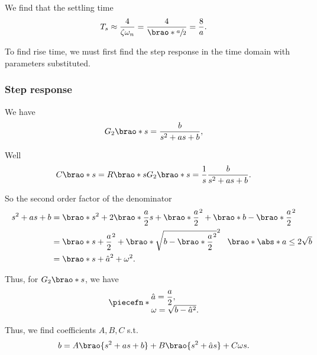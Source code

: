 \documentclass[12pt]{article}
\DeclarePairedDelimiter\brao()%
\DeclarePairedDelimiter\abs||
\DeclarePairedDelimiter\piecefn\{.
\begin{document}
\begin{enumerate}[(a)]
        We find that the settling time
        \begin{equation}
            T_s \approx \frac4{\zeta\omega_n} = \frac4{\brao*{\sfrac{a}2}} = \frac8a.
        \end{equation}

        To find rise time, we must first find the step response in the time domain with parameters substituted.

        \subsubsection{Step response}
        We have
        \[
            G_2\brao*s = \frac{b}{s^2 + as + b},
        \]

        Well
        \begin{equation}
            C\brao*s = R\brao*s G_2\brao*s = \frac1s \frac{b}{s^2 + as + b}.
        \end{equation}

        So the second order factor of the denominator
        \begin{equation}\label{eq:sum of squares}
            \begin{aligned}
                s^2 + as + b
                &{} = \brao*{s^2 + 2\brao*{\frac{a}2}s + \brao*{\frac{a}2}^2} + \brao*{b - \brao*{\frac{a}2}^2}
            \\*
                &{} = \brao*{s + \frac{a}2}^2 + \brao*{\sqrt{b - \brao*{\frac{a}2}^2}}^2
                \rlap{
                    $\hskip0.5em\brao*{\abs*{a} \leq 2\sqrt{b}}$
                }
            \\*
                &{}= \brao*{s + \hat{a}}^2 + \omega^2.
            \\*
            \end{aligned}
        \end{equation}

        Thus, for $G_2\brao*s$, we have
        \begin{equation}
            \piecefn*{
                \begin{array}{@{}l@{}}
                    \displaystyle
                    \hat{a} = \frac{a}2, \\*
                    \omega = \sqrt{b - \hat{a}^2}. \\*
                \end{array}
            }
        \end{equation}

        Thus, we find coefficients $A,B,C$ s.t.
        \begin{equation}
            b = A\brao{s^2 + as + b} + B\brao{s^2 + \hat{a}s} + C\omega s.
        \end{equation}


\end{enumerate}
\end{document}
